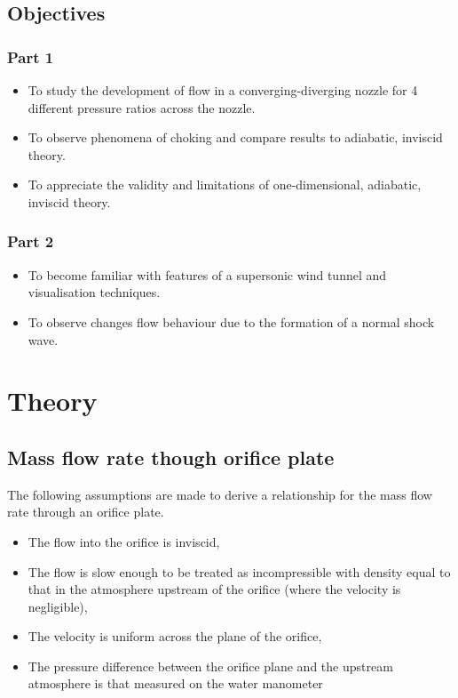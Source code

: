 \documentclass{article}
\begin{document}
\subsection{Objectives}

\subsubsection{Part 1}

\begin{itemize}
    \item To study the development of flow in a converging-diverging nozzle for 4 different pressure ratios across the nozzle.
    \item To observe phenomena of choking and compare results to adiabatic, inviscid theory.
    \item To appreciate the validity and limitations of one-dimensional, adiabatic, inviscid theory.
\end{itemize}

\subsubsection{Part 2}

\begin{itemize}
    \item To become familiar with features of a supersonic wind tunnel and visualisation techniques.
    \item To observe changes flow behaviour due to the formation of a normal shock wave.
\end{itemize}

\section{Theory}

\subsection{Mass flow rate though orifice plate}

The following assumptions are made to derive a relationship for the mass flow rate through an orifice plate.
\begin{itemize}
    \item The flow into the orifice is inviscid,
    \item The flow is slow enough to be treated as incompressible with density equal to that in the atmosphere upstream of the orifice (where the velocity is negligible),
    \item The velocity is uniform across the plane of the orifice,
    \item The pressure difference between the orifice plane and the upstream atmosphere is that measured on the water manometer
\end{itemize} 
\end{document}
